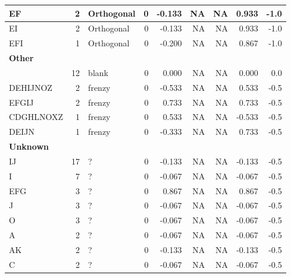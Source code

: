 \documentclass[
  letterpaper,
  DIV=11,
  numbers=noendperiod]{scrreprt}
\begin{document}
\begin{tabular}[t]{l|r|l|r|r|r|r|r|r}
\hline
\hspace{1em}EF & 2 & Orthogonal & 0 & -0.133 & NA & NA & 0.933 & -1.0\\
\hline
\hspace{1em}EI & 2 & Orthogonal & 0 & -0.133 & NA & NA & 0.933 & -1.0\\
\hline
\hspace{1em}EFI & 1 & Orthogonal & 0 & -0.200 & NA & NA & 0.867 & -1.0\\
\hline
\multicolumn{9}{l}{\textbf{Other}}\\
\hline
\hspace{1em} & 12 & blank & 0 & 0.000 & NA & NA & 0.000 & 0.0\\
\hline
\hspace{1em}DEHIJNOZ & 2 & frenzy & 0 & -0.533 & NA & NA & 0.533 & -0.5\\
\hline
\hspace{1em}EFGIJ & 2 & frenzy & 0 & 0.733 & NA & NA & 0.733 & -0.5\\
\hline
\hspace{1em}CDGHLNOXZ & 1 & frenzy & 0 & 0.533 & NA & NA & -0.533 & -0.5\\
\hline
\hspace{1em}DEIJN & 1 & frenzy & 0 & -0.333 & NA & NA & 0.733 & -0.5\\
\hline
\multicolumn{9}{l}{\textbf{Unknown}}\\
\hline
\hspace{1em}IJ & 17 & ? & 0 & -0.133 & NA & NA & -0.133 & -0.5\\
\hline
\hspace{1em}I & 7 & ? & 0 & -0.067 & NA & NA & -0.067 & -0.5\\
\hline
\hspace{1em}EFG & 3 & ? & 0 & 0.867 & NA & NA & 0.867 & -0.5\\
\hline
\hspace{1em}J & 3 & ? & 0 & -0.067 & NA & NA & -0.067 & -0.5\\
\hline
\hspace{1em}O & 3 & ? & 0 & -0.067 & NA & NA & -0.067 & -0.5\\
\hline
\hspace{1em}A & 2 & ? & 0 & -0.067 & NA & NA & -0.067 & -0.5\\
\hline
\hspace{1em}AK & 2 & ? & 0 & -0.133 & NA & NA & -0.133 & -0.5\\
\hline
\hspace{1em}C & 2 & ? & 0 & -0.067 & NA & NA & -0.067 & -0.5\\

\end{tabular}
\end{document}
